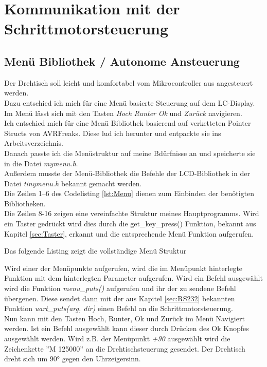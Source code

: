 \section{Kommunikation mit der Schrittmotorsteuerung}
\subsection{Menü Bibliothek / Autonome Ansteuerung}
\label{sec:menu}
Der Drehtisch soll leicht und komfortabel vom Mikrocontroller aus angesteuert werden.\\
Dazu entschied ich mich für eine Menü basierte Steuerung auf dem LC-Display. Im Menü lässt sich mit den Tasten \emph{Hoch} \emph{Runter} \emph{Ok} und \emph{Zurück} navigieren.\\
Ich entschied mich für eine Menü Bibliothek basierend auf verketteten Pointer Structs von AVRFreaks\cite{AVRFreaks:Menu}. Diese lud ich herunter und entpackte sie ins Arbeitsverzeichnis.\\
Danach passte ich die Menüstruktur auf meine Bdürfnisse an und speicherte sie in die Datei \emph{mymenu.h}.\\
Außerdem musste der Menü-Bibliothek die Befehle der LCD-Bibliothek in der Datei \emph{tinymenu.h} bekannt gemacht werden.\\
Die Zeilen 1--6 des Codelisting \ref{lst:Menu} dienen zum Einbinden der benötigten Bibliotheken.\\
Die Zeilen 8-16 zeigen eine vereinfachte Struktur meines  Hauptprogramms. Wird ein Taster gedrückt wird dies durch die get\_key\_press() Funktion, bekannt aus Kapitel \ref{sec:Taster}, erkannt und die entsprechende Menü Funktion aufgerufen.
\lstset{language=C, basicstyle=\footnotesize, showstringspaces=false, tabsize=8}

Das folgende Listing zeigt die vollständige Menü Struktur
\lstset{language=C, basicstyle=\footnotesize, showstringspaces=false, tabsize=8}

Wird einer der Menüpunkte aufgerufen, wird die im Menüpunkt hinterlegte Funktion mit dem hinterlegten Parameter aufgerufen.
Wird ein Befehl ausgewählt wird die Funktion \emph{menu\_puts()} aufgerufen und ihr der zu sendene Befehl übergenen. Diese sendet dann mit der aus Kapitel \ref{sec:RS232} bekannten Funktion \emph{uart\_puts(arg, dir)} einen Befehl an die Schrittmotorsteuerung.\\
Nun kann mit den Tasten Hoch, Runter, Ok und Zurück im Menü Navigiert werden. Ist ein Befehl ausgewählt kann dieser durch Drücken des Ok Knopfes ausgewählt werden. Wird z.B. der Menüpunkt \emph{+90} ausgewählt wird die Zeichenkette ''M 125000'' an die Drehtischsteuerung gesendet. Der Drehtisch dreht sich um 90° gegen den Uhrzeigersinn.

